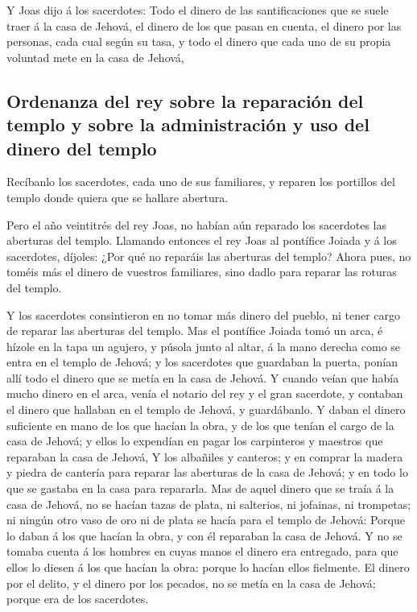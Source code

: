  Y Joas dijo á los sacerdotes: Todo el dinero de las
santificaciones que se suele traer á la casa de Jehová, el dinero de los
que pasan en cuenta, el dinero por las personas, cada cual según su
tasa, y todo el dinero que cada uno de su propia voluntad mete en la
casa de Jehová,

\hypertarget{ordenanza-del-rey-sobre-la-reparaciuxf3n-del-templo-y-sobre-la-administraciuxf3n-y-uso-del-dinero-del-templo}{%
\subsection{Ordenanza del rey sobre la reparación del templo y sobre la
administración y uso del dinero del
templo}\label{ordenanza-del-rey-sobre-la-reparaciuxf3n-del-templo-y-sobre-la-administraciuxf3n-y-uso-del-dinero-del-templo}}

 Recíbanlo los sacerdotes, cada uno de sus familiares, y
reparen los portillos del templo donde quiera que se hallare abertura.

 Pero el año veintitrés del rey Joas, no habían aún reparado
los sacerdotes las aberturas del templo.  Llamando entonces
el rey Joas al pontífice Joiada y á los sacerdotes, díjoles: ¿Por qué no
reparáis las aberturas del templo? Ahora pues, no toméis más el dinero
de vuestros familiares, sino dadlo para reparar las roturas del templo.

 Y los sacerdotes consintieron en no tomar más dinero del
pueblo, ni tener cargo de reparar las aberturas del templo. 
Mas el pontífice Joiada tomó un arca, é hízole en la tapa un agujero, y
púsola junto al altar, á la mano derecha como se entra en el templo de
Jehová; y los sacerdotes que guardaban la puerta, ponían allí todo el
dinero que se metía en la casa de Jehová.  Y cuando veían
que había mucho dinero en el arca, venía el notario del rey y el gran
sacerdote, y contaban el dinero que hallaban en el templo de Jehová, y
guardábanlo.  Y daban el dinero suficiente en mano de los
que hacían la obra, y de los que tenían el cargo de la casa de Jehová; y
ellos lo expendían en pagar los carpinteros y maestros que reparaban la
casa de Jehová,  Y los albañiles y canteros; y en comprar
la madera y piedra de cantería para reparar las aberturas de la casa de
Jehová; y en todo lo que se gastaba en la casa para repararla.
 Mas de aquel dinero que se traía á la casa de Jehová, no
se hacían tazas de plata, ni salterios, ni jofainas, ni trompetas; ni
ningún otro vaso de oro ni de plata se hacía para el templo de Jehová:
 Porque lo daban á los que hacían la obra, y con él
reparaban la casa de Jehová.  Y no se tomaba cuenta á los
hombres en cuyas manos el dinero era entregado, para que ellos lo diesen
á los que hacían la obra: porque lo hacían ellos fielmente.
 El dinero por el delito, y el dinero por los pecados, no
se metía en la casa de Jehová; porque era de los sacerdotes.

